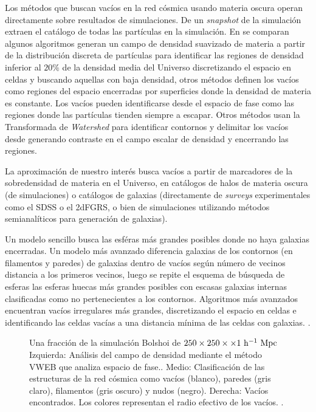 \documentclass[preprint]{aastex62}
\begin{document}
  Los métodos que buscan vacíos en la red cósmica usando materia oscura operan directamente sobre
  resultados de simulaciones. De un \textit{snapshot} de la simulación extraen el catálogo de todas
  las partículas en la simulación. En \citet{Aspen-Amsterdam2008} se comparan algunos algoritmos
  generan un campo de densidad suavizado de materia a partir de la distribución discreta de partículas
  para identificar las regiones de  densidad inferior al $20\%$ de la densidad media del Universo
  discretizando el espacio en celdas y buscando aquellas con baja densidad, 
  otros métodos definen los vacíos como regiones del espacio encerradas por superficies
  donde la densidad de materia es constante.  Los vacíos pueden identificarse desde el espacio de
  fase como las regiones donde las partículas tienden siempre a escapar. Otros métodos usan la
  Transformada de \textit{Watershed} para identificar contornos y delimitar los vacíos desde
  generando contraste en el campo escalar de densidad y encerrando las regiones.

  La aproximación de nuestro interés busca vacíos a partir de marcadores de la sobredensidad de materia
  en el Universo, en catálogos de halos de materia oscura (de simulaciones) o
  catálogos de galaxias (directamente de \textit{surveys} experimentales como el SDSS o el 2dFGRS, o bien
  de simulaciones utilizando métodos semianalíticos para generación de galaxias).

  Un modelo sencillo busca las esféras más grandes posibles  donde no haya galaxias encerradas.
  Un modelo más avanzado diferencia galaxias de los contornos (en filamentos y paredes)
  de galaxias dentro de vacíos según número de vecinos distancia a los primeros vecinos, luego se repite
  el esquema de búsqueda de esferas las esferas huecas más grandes posibles con escasas galaxias
  internas clasificadas como no pertenecientes a los contornos. Algoritmos más avanzados
  encuentran vacíos irregulares más grandes, discretizando el espacio en celdas e identificando las celdas
  vacías a una distancia mínima de las celdas con galaxias. \citep{Aspen-Amsterdam2008}.
  \begin{figure}
    \caption{Una fracción de la simulación Bolshoi \citep{Multidark2013} de $250 \times 250 \times \times 1 \rm ~h^{-1}~Mpc$
      Izquierda: Análisis del campo de densidad mediante el método VWEB que analiza espacio de fase..
      Medio: Clasificación de las estructuras de la red cósmica como vacíos (blanco),
      paredes (gris claro), filamentos (gris oscuro) y nudos (negro).
      Derecha: Vacíos encontrados. Los colores representan el radio efectivo de los vacíos.
      \citep{Fang2018}. \label{fig:voids_in_simulations}}
  \end{figure}
\end{document}
